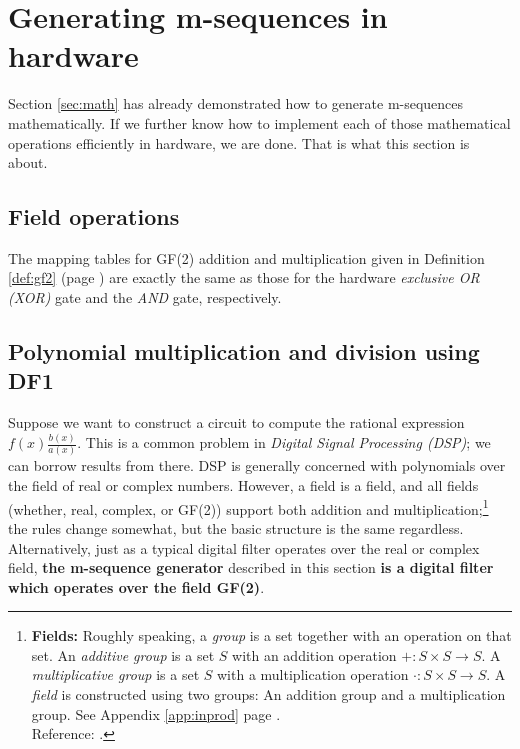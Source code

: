 \section{Generating m-sequences in hardware}
\label{sec:hw}
Section \ref{sec:math} has already demonstrated how to generate m-sequences
mathematically.
If we further know how to implement each of those mathematical operations 
efficiently in hardware, we are done.
That is what this section is about.

\subsection{Field operations}
The mapping tables for GF(2) addition and multiplication
given in Definition \ref{def:gf2} (page \pageref{def:gf2})
are exactly the same as those for the hardware {\em exclusive OR (XOR)} gate
and the {\em AND} gate, respectively.

\subsection{Polynomial multiplication and division using DF1}
Suppose we want to construct a circuit to compute the 
rational expression $f(x)\frac{b(x)}{a(x)}$.
This is a common problem in {\em Digital Signal Processing (DSP)};
we can borrow results from there.
DSP is generally concerned with polynomials over the field of real or complex numbers.
However, a field is a field, and all fields (whether, real, complex, or GF(2))
support both addition and multiplication;\footnote{
   {\bf Fields:} Roughly speaking, a {\em group} is a set together with an operation 
   on that set.  
   An {\em additive group} is a set $S$ 
   with an addition operation $+:S\times S\to S$.
   A {\em multiplicative group} is a set $S$ 
   with a multiplication operation $\cdot:S\times S\to S$.
   A {\em field} is constructed using two groups: 
   An addition group and a multiplication group.
   See Appendix \ref{app:inprod} page \pageref{app:inprod}.\\
   Reference: \cite[p.123]{durbin}.
   }
the rules change somewhat, but the basic structure is the same regardless.
Alternatively, just as a typical digital filter operates over the real 
or complex field, 
{\bf the m-sequence generator} described in this section
{\bf is a digital filter which operates over the field GF(2)}.


